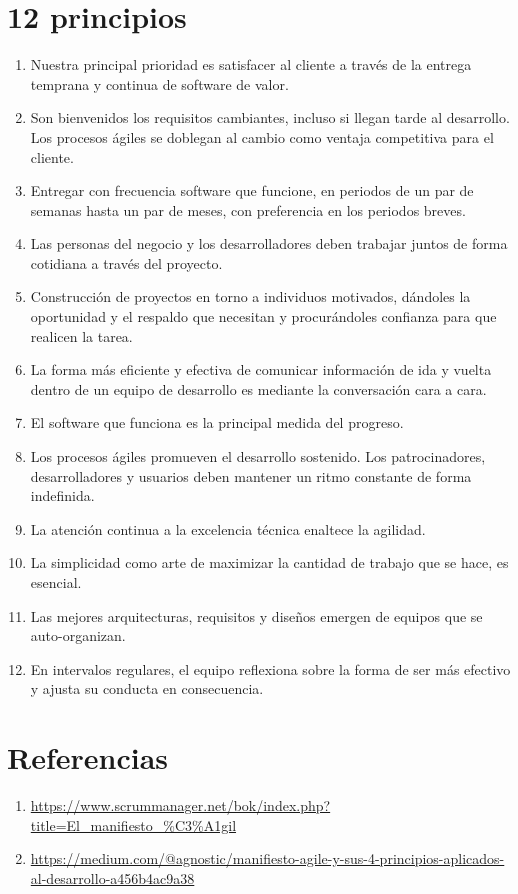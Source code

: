 \documentclass{article}
\begin{document}
\section{12 principios}
\begin{enumerate}
    \item Nuestra principal prioridad es satisfacer al cliente a través de la entrega temprana y continua de software de valor.
    \item Son bienvenidos los requisitos cambiantes, incluso si llegan tarde al desarrollo. Los procesos ágiles se doblegan al cambio como ventaja competitiva para el cliente.
    \item Entregar con frecuencia software que funcione, en periodos de un par de semanas hasta un par de meses, con preferencia en los periodos breves.
    \item Las personas del negocio y los desarrolladores deben trabajar juntos de forma cotidiana a través del proyecto.
    \item Construcción de proyectos en torno a individuos motivados, dándoles la oportunidad y el respaldo que necesitan y procurándoles confianza para que realicen la tarea.
    \item La forma más eficiente y efectiva de comunicar información de ida y vuelta dentro de un equipo de desarrollo es mediante la conversación cara a cara.
    \item El software que funciona es la principal medida del progreso.
    \item Los procesos ágiles promueven el desarrollo sostenido. Los patrocinadores, desarrolladores y usuarios deben mantener un ritmo constante de forma indefinida.
    \item La atención continua a la excelencia técnica enaltece la agilidad.
    \item La simplicidad como arte de maximizar la cantidad de trabajo que se hace, es esencial.
    \item Las mejores arquitecturas, requisitos y diseños emergen de equipos que se auto-organizan.
    \item En intervalos regulares, el equipo reflexiona sobre la forma de ser más efectivo y ajusta su conducta en consecuencia.
\end{enumerate}

\section*{Referencias}
\begin{enumerate}
    \item \url{https://www.scrummanager.net/bok/index.php?title=El_manifiesto_%C3%A1gil}
    \item \url{https://medium.com/@agnostic/manifiesto-agile-y-sus-4-principios-aplicados-al-desarrollo-a456b4ac9a38}
\end{enumerate}


\end{document}
